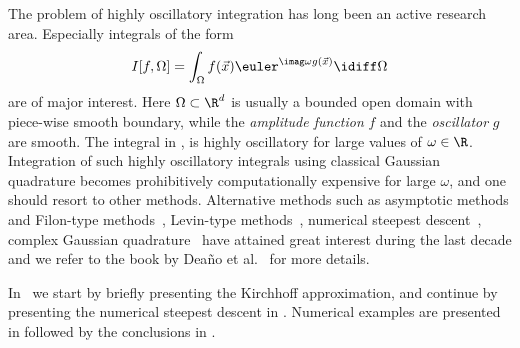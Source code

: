 The problem of highly oscillatory integration has long been an active research area. Especially integrals of the form
\begin{equation}\label{Eq4:oscillatoryIntegral}
	I[f,\Omega]=\int_{\Omega} f(\vec{x})\euler^{\imag \omega g(\vec{x})}\idiff \Omega
\end{equation}
are of major interest. Here $\Omega\subset\R^d$ is usually a bounded open domain with piece-wise smooth boundary, while the \textit{amplitude function} $f$ and the \textit{oscillator} $g$ are smooth. The integral in , is highly oscillatory for large values of $\omega\in\R$. Integration of such highly oscillatory integrals using classical Gaussian quadrature becomes prohibitively computationally expensive for large $\omega$, and one should resort to other methods. Alternative methods such as asymptotic methods and Filon-type methods~\cite{Dominguez2011sae,Iserles2004oqm,Iserles2005eqo}, Levin-type methods~\cite{Levin1996fio,Olver2006mfn}, numerical steepest descent~\cite{Huybrechs2006ote,Deano2018cho}, complex Gaussian quadrature~\cite{Asheim2013cgq,Deano2015tkp} have attained great interest during the last decade and we refer to the book by Dea{\~{n}}o et al.~\cite{Deano2018cho} for more details. 

In~ we start by briefly presenting the Kirchhoff approximation, and continue by presenting the numerical steepest descent in . Numerical examples are presented in  followed by the conclusions in .